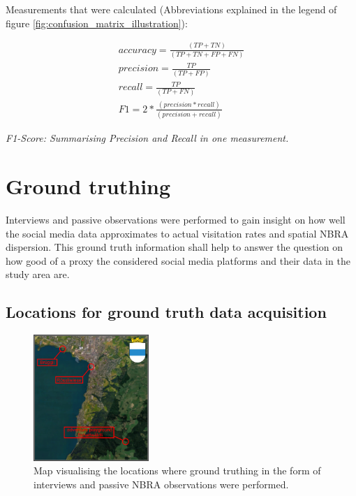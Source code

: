 Measurements that were calculated (Abbreviations explained in the legend of figure \ref{fig:confusion_matrix_illustration}):

\begin{gather*}
accuracy = \frac{(TP+TN)}{(TP+TN+FP+FN)}\\
precision = \frac{TP}{(TP+FP)}\\
recall = \frac{TP}{(TP+FN)}\\
F1 = 2*\frac{(precision*recall)}{(precision+recall)}
\end{gather*}

\textit{F1-Score: Summarising Precision and Recall in one measurement.}

\clearpage

\section{Ground truthing} \label{groud_truthing}
Interviews and passive observations were performed to gain insight on how well the social media data approximates to actual visitation rates and spatial NBRA dispersion. This ground truth information shall help to answer the question on how good of a proxy the considered social media platforms and their data in the study area are.

\subsection{Locations for ground truth data acquisition} \label{locations_ground_truthing_data}

\begin{figure} %
    \centerline{\includegraphics[trim={0 0 0 0},clip,width=0.39\textwidth]{img/interviews_locations}}
  \caption{Map visualising the locations where ground truthing in the form of interviews and passive NBRA observations were performed.}
  \label{fig:locations_ground_truthing}
\end{figure}

